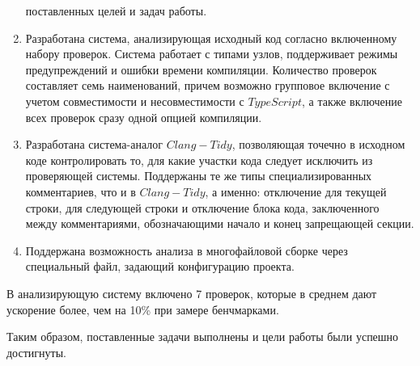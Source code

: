 \documentclass{mipt-thesis-bs}
\begin{document}
\begin{enumerate}
    поставленных целей и задач работы.
    \item Разработана система, анализирующая исходный код согласно включенному набору проверок. Система работает 
    с типами узлов, поддерживает режимы предупреждений и ошибки времени компиляции. Количество проверок составляет 
    семь наименований, причем возможно групповое включение с учетом совместимости и несовместимости с 
    $TypeScript$, а также включение всех проверок сразу одной опцией компиляции.
    \item Разработана система-аналог $Clang-Tidy$, позволяющая точечно в исходном коде контролировать 
    то, для какие участки кода следует исключить из проверяющей системы. Поддержаны те же типы специализированных 
    комментариев, что и в $Clang-Tidy$, а именно: отключение для текущей строки, для следующей строки и отключение 
    блока кода, заключенного между комментариями, обозначающими начало и конец запрещающей секции.
    \item Поддержана возможность анализа в многофайловой сборке через специальный файл, задающий 
    конфигурацию проекта.
\end{enumerate}

В анализирующую систему включено 7 проверок, которые в среднем дают ускорение более, чем на 10\% 
при замере бенчмарками.

Таким образом, поставленные задачи выполнены и цели работы были успешно 
достигнуты.

\backmatter
\end{document}
